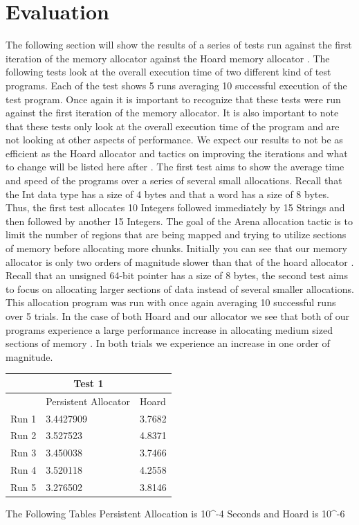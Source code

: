 \documentclass[conference]{IEEEtran}
\begin{document}
\section{Evaluation}
The following section will show the results of a series of tests run against the first iteration of the memory allocator against the Hoard memory allocator \cite{berger-asplos-2000}. The following tests look at the overall execution time of two different kind of test programs. Each of the test shows 5 runs averaging 10 successful execution of the test program. Once again it is important to recognize that these tests were run against the first iteration of the memory allocator. It is also important to note that these tests only look at the overall execution time of the program and are not looking at other aspects of performance. We expect our results to not be as efficient as the Hoard allocator and tactics on improving the iterations and what to change will be listed here after \cite{berger-asplos-2000}. The first test aims to show the average time and speed of the programs over a series of several small allocations. Recall that the Int data type has a size of 4 bytes and that a word has a size of 8 bytes. Thus, the first test allocates 10 Integers followed immediately by 15 Strings and then followed by another 15 Integers. The goal of the Arena allocation tactic is to limit the number of regions that are being mapped and trying to utilize sections of memory before allocating more chunks. Initially you can see that our memory allocator is only two orders of magnitude slower than that of the hoard allocator \cite{berger-asplos-2000}. Recall that an unsigned 64-bit pointer has a size of 8 bytes, the second test aims to focus on allocating larger sections of data instead of several smaller allocations. This allocation program was run with once again averaging 10 successful runs over 5 trials. In the case of both Hoard and our allocator we see that both of our programs experience a large performance increase in allocating medium sized sections of memory \cite{berger-asplos-2000}. In both trials we experience an increase in one order of magnitude.  



\begin{tabular}{ |p{1cm}||p{3cm}|p{3cm}|  }
 \hline
 \multicolumn{3}{|c|}{Test 1} \\
 \hline
 & Persistent Allocator & Hoard \\
 \hline
 Run 1   &3.4427909    &3.7682\\
 Run 2&   3.527523  & 4.8371   \\
 Run 3 &3.450038 & 3.7466  \\
 Run 4& 3.520118& 4.2558\\
 Run 5&   3.276502  &3.8146\\
 \hline
\end{tabular}
 The Following Tables Persistent Allocation is 10^-4 Seconds and Hoard is 10^-6
\\
\end{document}

